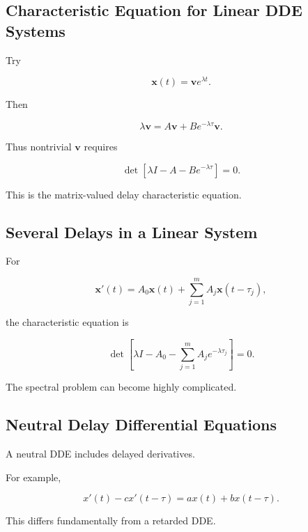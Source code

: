 \subsection{Characteristic Equation for Linear DDE Systems}
\label{subsec:linear-dde-system-characteristic}

Try

\[
\mathbf{x}(t)
=
\mathbf{v}e^{\lambda t}.
\]

Then

\[
\lambda\mathbf{v}
=
A\mathbf{v}
+
Be^{-\lambda\tau}\mathbf{v}.
\]

Thus nontrivial \(\mathbf{v}\) requires

\[
\boxed{
\det
\left[
\lambda I
-
A
-
Be^{-\lambda\tau}
\right]
=
0.
}
\]

This is the matrix-valued delay characteristic equation.

\subsection{Several Delays in a Linear System}
\label{subsec:linear-system-multiple-delays}

For

\[
\mathbf{x}'(t)
=
A_0\mathbf{x}(t)
+
\sum_{j=1}^{m}
A_j
\mathbf{x}(t-\tau_j),
\]

the characteristic equation is

\[
\boxed{
\det
\left[
\lambda I
-
A_0
-
\sum_{j=1}^{m}
A_je^{-\lambda\tau_j}
\right]
=
0.
}
\]

The spectral problem can become highly complicated.

\subsection{Neutral Delay Differential Equations}
\label{subsec:neutral-delay-differential-equations}

A neutral DDE includes delayed derivatives.

For example,

\[
\boxed{
x'(t)
-
c x'(t-\tau)
=
ax(t)
+
bx(t-\tau).
}
\]

This differs fundamentally from a retarded DDE.

